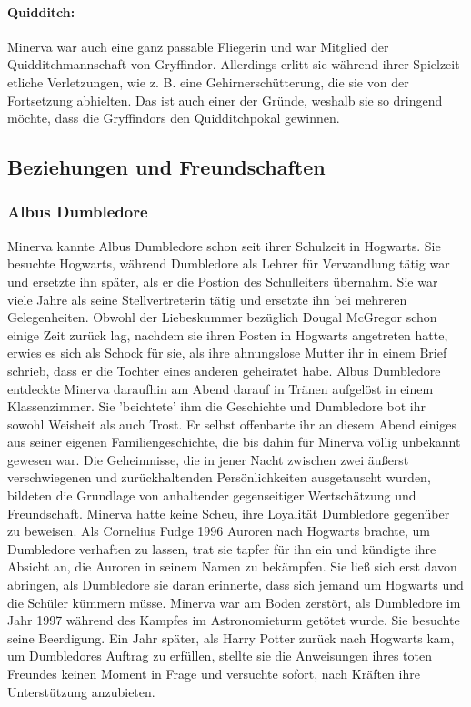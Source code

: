 \documentclass[a4paper, 10pt]{article}
\begin{document}
\paragraph{Quidditch:} 
Minerva war auch eine ganz passable Fliegerin und war Mitglied der Quidditchmannschaft von Gryffindor. Allerdings erlitt sie während ihrer Spielzeit etliche Verletzungen, wie z. B. eine Gehirnerschütterung, die sie von der Fortsetzung abhielten. Das ist auch einer der Gründe, weshalb sie so dringend möchte, dass die Gryffindors den Quidditchpokal gewinnen.
\subsection*{\Large Beziehungen und Freundschaften}
\subsubsection*{\large Albus Dumbledore}
Minerva kannte Albus Dumbledore schon seit ihrer Schulzeit in Hogwarts. Sie besuchte Hogwarts, während Dumbledore als Lehrer für Verwandlung tätig war und ersetzte ihn später, als er die Postion des Schulleiters übernahm. Sie war viele Jahre als seine Stellvertreterin tätig und ersetzte ihn bei mehreren Gelegenheiten.
\vspace{10pt}
\newline
{}  
Obwohl der Liebeskummer bezüglich Dougal McGregor schon einige Zeit zurück lag, nachdem sie ihren Posten in Hogwarts angetreten hatte, erwies es sich als Schock für sie, als ihre ahnungslose Mutter ihr in einem Brief schrieb, dass er die Tochter eines anderen geheiratet habe. Albus Dumbledore entdeckte Minerva daraufhin am Abend darauf in Tränen aufgelöst in einem
Klassenzimmer. Sie 'beichtete' ihm die Geschichte und Dumbledore bot ihr sowohl Weisheit als auch Trost. Er selbst offenbarte ihr an diesem Abend einiges aus seiner eigenen Familiengeschichte, die bis dahin für Minerva völlig unbekannt gewesen war. Die Geheimnisse, die in jener Nacht zwischen zwei äußerst verschwiegenen und zurückhaltenden Persönlichkeiten ausgetauscht wurden, bildeten die Grundlage von anhaltender gegenseitiger Wertschätzung und Freundschaft.
\vspace{10pt}
\newline
{}  
Minerva hatte keine Scheu, ihre Loyalität Dumbledore gegenüber zu beweisen. Als Cornelius Fudge 1996 Auroren nach Hogwarts brachte, um Dumbledore verhaften zu lassen, trat sie tapfer für ihn ein und kündigte ihre Absicht an, die Auroren in seinem Namen zu bekämpfen. Sie ließ sich erst davon abringen, als Dumbledore sie daran erinnerte, dass sich jemand um Hogwarts und die Schüler kümmern müsse.
\vspace{10pt}
\newline
{}  
Minerva war am Boden zerstört, als Dumbledore im Jahr 1997 während des Kampfes im Astronomieturm getötet wurde. Sie besuchte seine Beerdigung. Ein Jahr später, als Harry Potter zurück nach Hogwarts kam, um Dumbledores Auftrag zu erfüllen, stellte sie die Anweisungen ihres toten Freundes keinen Moment in Frage und versuchte sofort, nach Kräften ihre Unterstützung anzubieten.
\end{document}

